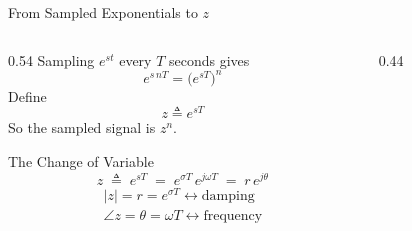 \begin{frame}[t]{From Sampled Exponentials to \texorpdfstring{$z$}{z}}
  \small
  \begin{columns}[T]
    \begin{column}{0.54\textwidth}
      Sampling $e^{st}$ every $T$ seconds gives
      \[
        e^{s\,nT} = \bigl(e^{sT}\bigr)^n
      \]
      Define
      \[z \triangleq e^{sT}\]
      So the sampled signal is $z^n$.

      \begin{conceptbox}{The Change of Variable}
        \vspace{-0.15cm}
        \[
          z \;\triangleq\; e^{sT}
          \;=\; e^{\sigma T}\, e^{j\omega T}
          \;=\; r\, e^{j\theta}
        \]
        \begin{align*}
          |z| = r = e^{\sigma T} \leftrightarrow \text{damping}  \\
          \angle z = \theta = \omega T \leftrightarrow  \text{frequency}
        \end{align*}
      \end{conceptbox}

    \end{column}
    \begin{column}{0.44\textwidth}
      \begin{center}

        \vspace{2cm}

      \end{center}
    \end{column}
  \end{columns}
\end{frame}


